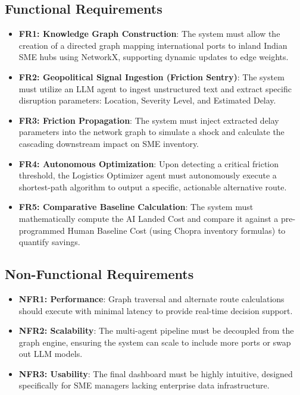 \subsection[Functional Requirements]{Functional Requirements}
\begin{itemize}
\item \textbf{FR1: Knowledge Graph Construction}: The system must allow the creation of a directed graph mapping international ports to inland Indian SME hubs using NetworkX, supporting dynamic updates to edge weights.
\item \textbf{FR2: Geopolitical Signal Ingestion (Friction Sentry)}: The system must utilize an LLM agent to ingest unstructured text and extract specific disruption parameters: Location, Severity Level, and Estimated Delay.
\item \textbf{FR3: Friction Propagation}: The system must inject extracted delay parameters into the network graph to simulate a shock and calculate the cascading downstream impact on SME inventory.
\item \textbf{FR4: Autonomous Optimization}: Upon detecting a critical friction threshold, the Logistics Optimizer agent must autonomously execute a shortest-path algorithm to output a specific, actionable alternative route.
\item \textbf{FR5: Comparative Baseline Calculation}: The system must mathematically compute the AI Landed Cost and compare it against a pre-programmed Human Baseline Cost (using Chopra inventory formulas) to quantify savings.
\end{itemize}
\subsection[Non-Functional Requirements]{Non-Functional Requirements}
\begin{itemize}
\item \textbf{NFR1: Performance}: Graph traversal and alternate route calculations should execute with minimal latency to provide real-time decision support.
\item \textbf{NFR2: Scalability}: The multi-agent pipeline must be decoupled from the graph engine, ensuring the system can scale to include more ports or swap out LLM models.
\item \textbf{NFR3: Usability}: The final dashboard must be highly intuitive, designed specifically for SME managers lacking enterprise data infrastructure.
\end{itemize}
